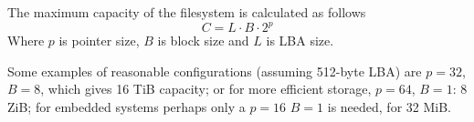 \documentclass[]{article}
\begin{document}
	The maximum capacity of the filesystem is calculated as follows
	\begin{equation}
		C = L \cdot B \cdot 2^p
	\end{equation}
	Where $p$ is pointer size, $B$ is block size and $L$ is LBA size.
	
	Some examples of reasonable configurations (assuming 512-byte LBA) are $p = 32$, $B = 8$, which gives 16 TiB capacity; or for more efficient storage, $p = 64$, $B = 1$: 8 ZiB; for embedded systems perhaps only a $p = 16$ $B = 1$ is needed, for 32 MiB.
	
	
\end{document}
